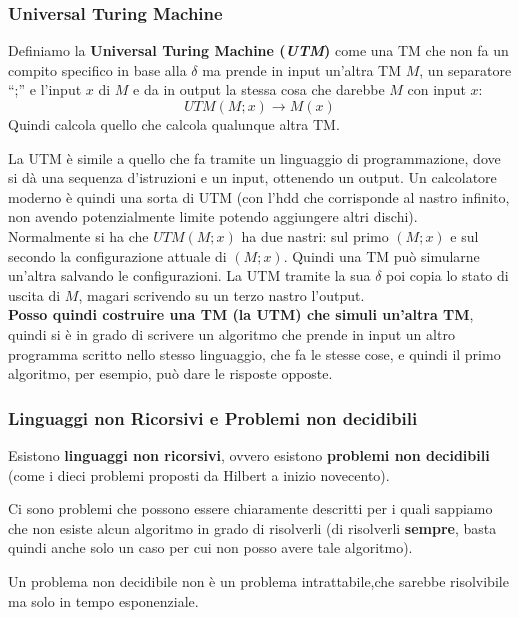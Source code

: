 \subsubsection{Universal Turing Machine}
\begin{definizione}
  Definiamo la \textbf{Universal Turing Machine (\textit{UTM})} come una TM che
  non fa un compito specifico in base alla $\delta$ ma prende in input un'altra
  TM $M$, un separatore ``;'' e l'input $x$ di $M$ e da in output la stessa cosa
  che darebbe $M$ con input $x$:
  \[UTM(M;x)\to M(x)\]
  Quindi calcola quello che calcola qualunque altra TM.
\end{definizione}
La UTM è simile a quello che fa tramite un linguaggio di programmazione, dove si dà una sequenza d'istruzioni e un input, ottenendo un output. Un calcolatore moderno è quindi una sorta di UTM (con l'hdd che corrisponde al nastro infinito, non avendo potenzialmente limite potendo aggiungere altri dischi).\\ Normalmente si ha che $UTM(M;x)$ ha due nastri: sul primo $(M;x)$ e sul secondo la configurazione attuale di $(M;x)$. Quindi una TM può simularne un'altra salvando le configurazioni. La UTM tramite la sua $\delta$ poi copia lo stato di uscita di $M$, magari scrivendo su un terzo nastro l'output.\\ \textbf{Posso quindi costruire una TM (la UTM) che simuli un'altra TM}, quindi si è in grado di scrivere un algoritmo che prende in input un altro programma scritto nello stesso linguaggio, che fa le stesse cose, e quindi il primo algoritmo, per esempio, può dare le risposte opposte.\\
\subsubsection{Linguaggi non Ricorsivi e Problemi non decidibili}
\begin{definizione}
  Esistono \textbf{linguaggi non ricorsivi}, ovvero esistono \textbf{problemi non decidibili} (come i dieci problemi proposti da Hilbert a inizio novecento).
\end{definizione}
Ci sono problemi che possono essere chiaramente descritti per i quali sappiamo
che non esiste alcun algoritmo in grado di risolverli (di risolverli
\textbf{sempre}, basta quindi anche solo un caso per cui non posso avere tale algoritmo). 
\begin{definizione}
  Un problema non decidibile non è un problema intrattabile,che sarebbe risolvibile ma solo in tempo esponenziale.
\end{definizione}

